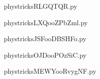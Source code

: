     

    \clearpage
    


    \newcommand{\CaptionFigRLGQTQR}{<+Type your caption here+>}
    \begin{center}
        
    \end{center}
    phystricksRLGQTQR.py

    

    \clearpage
    


    \newcommand{\CaptionFigLXQooZPbZml}{<+Type your caption here+>}
    \begin{center}
        
    \end{center}
    phystricksLXQooZPbZml.py

    

    \clearpage
    


    \newcommand{\CaptionFigJSFooDBSHFo}{<+Type your caption here+>}
    \begin{center}
        
    \end{center}
    phystricksJSFooDBSHFo.py

    

    \clearpage
    


    \newcommand{\CaptionFigOJDooPOzSiC}{<+Type your caption here+>}
    \begin{center}
        
    \end{center}
    phystricksOJDooPOzSiC.py

    

    \clearpage
    


    \newcommand{\CaptionFigMEWYooRvygNF}{<+Type your caption here+>}
    \begin{center}
        
    \end{center}
    phystricksMEWYooRvygNF.py

    

    \clearpage
    



